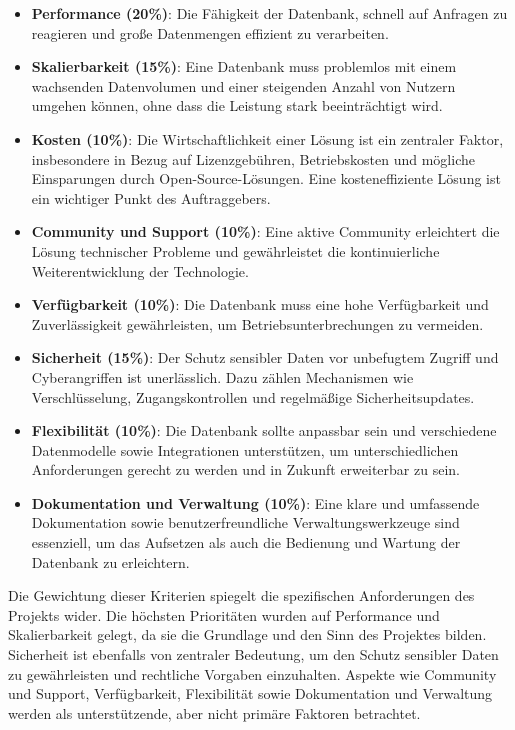 \begin{itemize}
	\item \textbf{Performance (20\%)}: 
	Die Fähigkeit der Datenbank, schnell auf Anfragen zu reagieren und große Datenmengen effizient zu verarbeiten.
	
	\item \textbf{Skalierbarkeit (15\%)}: 
	Eine Datenbank muss problemlos mit einem wachsenden Datenvolumen und einer steigenden Anzahl von Nutzern umgehen können, ohne dass die Leistung stark beeinträchtigt wird.
	
	\item \textbf{Kosten (10\%)}: 
	Die Wirtschaftlichkeit einer Lösung ist ein zentraler Faktor, insbesondere in Bezug auf Lizenzgebühren, Betriebskosten und mögliche Einsparungen durch Open-Source-Lösungen. Eine kosteneffiziente Lösung ist ein wichtiger Punkt des Auftraggebers.
	
	\item \textbf{Community und Support (10\%)}: 
	Eine aktive Community erleichtert die Lösung technischer Probleme und gewährleistet die kontinuierliche Weiterentwicklung der Technologie.
	
	\item \textbf{Verfügbarkeit (10\%)}: 
	Die Datenbank muss eine hohe Verfügbarkeit und Zuverlässigkeit gewährleisten, um Betriebsunterbrechungen zu vermeiden.
	
	\item \textbf{Sicherheit (15\%)}: 
	Der Schutz sensibler Daten vor unbefugtem Zugriff und Cyberangriffen ist unerlässlich. Dazu zählen Mechanismen wie Verschlüsselung, Zugangskontrollen und regelmäßige Sicherheitsupdates.
	
	\item \textbf{Flexibilität (10\%)}: 
	Die Datenbank sollte anpassbar sein und verschiedene Datenmodelle sowie Integrationen unterstützen, um unterschiedlichen Anforderungen gerecht zu werden und in Zukunft erweiterbar zu sein.
	
	\item \textbf{Dokumentation und Verwaltung (10\%)}: 
	Eine klare und umfassende Dokumentation sowie benutzerfreundliche Verwaltungswerkzeuge sind essenziell, um das Aufsetzen als auch die Bedienung und Wartung der Datenbank zu erleichtern.
\end{itemize}

\noindent Die Gewichtung dieser Kriterien spiegelt die spezifischen Anforderungen des Projekts wider. Die höchsten Prioritäten wurden auf Performance und Skalierbarkeit gelegt, da sie die Grundlage und den Sinn des Projektes bilden. Sicherheit ist ebenfalls von zentraler Bedeutung, um den Schutz sensibler Daten zu gewährleisten und rechtliche Vorgaben einzuhalten. Aspekte wie Community und Support, Verfügbarkeit, Flexibilität sowie Dokumentation und Verwaltung werden als unterstützende, aber nicht primäre Faktoren betrachtet. 

